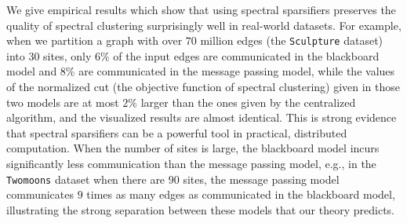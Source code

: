 We give empirical results which show that using spectral sparsifiers preserves the quality of spectral clustering surprisingly well in real-world datasets.
For example, when we partition a graph with over $70$ million edges (the {\tt Sculpture} dataset) into $30$ sites, only $6\%$ of the input edges are communicated in the blackboard model and $8\%$ are communicated in the message passing model, while the values of the normalized cut (the objective function of spectral clustering) given in those two models are at most $2\%$ larger than the ones given by the centralized algorithm, and the visualized results are almost identical. This is strong evidence that spectral sparsifiers can be a powerful tool in practical, distributed computation. When the number of sites is large, the blackboard model incurs significantly less communication than the message passing model, e.g., in the {\tt Twomoons} dataset when there are $90$ sites, the message passing model communicates $9$ times as many edges as communicated in the blackboard model, illustrating the strong separation between these models that our theory predicts.



